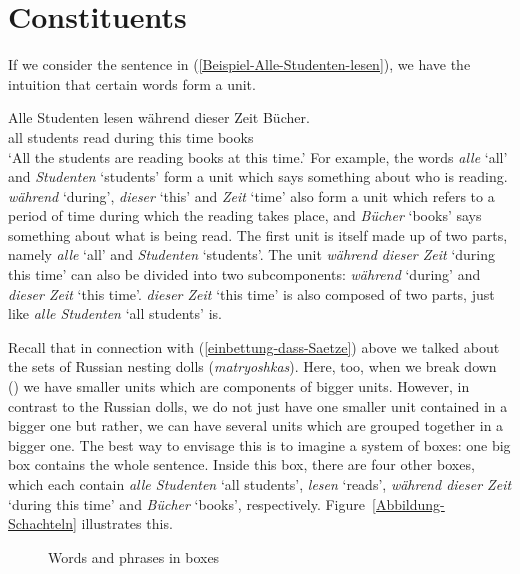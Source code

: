 \addlines
\section{Constituents}
\label{konstituententests}\label{sec-constituents}

If we consider the sentence in (\ref{Beispiel-Alle-Studenten-lesen}), we have the intuition that
certain words form a unit.

\ea
\label{Beispiel-Alle-Studenten-lesen}
\gll Alle Studenten lesen während dieser Zeit Bücher.\\
     all  students  read  during  this   time books\\
\glt `All the students are reading books at this time.'
\z
For example, the words \emph{alle} `all' and \emph{Studenten} `students' form a unit which says something about who is
reading. \emph{während} `during', \emph{dieser} `this' and \emph{Zeit} `time' also form a unit which refers to a period
  of time during which the reading takes place, and \emph{Bücher} `books' says something about what is
  being read. The first unit is itself made up of two parts, namely \emph{alle} `all'
and \emph{Studenten} `students'. The unit \emph{während dieser Zeit} `during this time' can also be divided into two
subcomponents: \emph{während} `during' and \emph{dieser Zeit} `this time'. \emph{dieser Zeit} `this time' is also composed of two
parts, just like \emph{alle Studenten} `all students' is. 

Recall that in connection with (\ref{einbettung-dass-Saetze}) above we talked about the sets of Russian nesting dolls (\emph{matryoshkas}). Here, too, when we break down () we have smaller units which are
components of bigger units. However, in contrast to the Russian dolls, we do not just have one
smaller unit contained in a bigger one but rather, we can have several units which are grouped
together in a bigger one. The best way to envisage this is to imagine a system of boxes: 
one big box contains the whole sentence. Inside this box, there are four other boxes, which each
contain \emph{alle Studenten} `all students', \emph{lesen} `reads', \emph{während
  dieser Zeit} `during this time' and \emph{Bücher} `books', respectively.
Figure~\vref{Abbildung-Schachteln} illustrates this.

\begin{figure}
\centering
{}
\caption{\label{Abbildung-Schachteln}Words and phrases in boxes}
\end{figure}%


